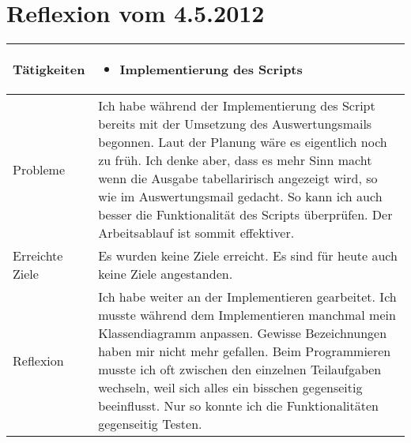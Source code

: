 
\begin{table}
\section{Reflexion vom 4.5.2012}
\begin{tabular}{| l | p{12cm} |}
    \hline
    Tätigkeiten &
    \begin{itemize}
        \item Implementierung des Scripts 
    \end{itemize}  \\
    \hline
    Probleme & 
    Ich habe während der Implementierung des Script bereits mit der Umsetzung des Auswertungsmails begonnen. Laut der Planung wäre es eigentlich noch zu früh. Ich denke aber, dass es mehr Sinn macht wenn die Ausgabe tabellaririsch angezeigt wird, so wie im Auswertungsmail gedacht. So kann ich auch besser die Funktionalität des Scripts überprüfen. Der Arbeitsablauf ist sommit effektiver.\\ 
    \hline
    Erreichte Ziele &
    Es wurden keine Ziele erreicht. Es sind für heute auch keine Ziele angestanden. \\
    \hline 
    Reflexion &
    Ich habe weiter an der Implementieren gearbeitet. Ich musste während dem Implementieren manchmal mein Klassendiagramm anpassen. Gewisse Bezeichnungen haben mir nicht mehr gefallen. Beim Programmieren musste ich oft zwischen den einzelnen Teilaufgaben wechseln, weil sich alles ein bisschen gegenseitig beeinflusst. Nur so konnte ich die Funktionalitäten gegenseitig Testen. \\ 
    \hline
\end{tabular}
\end{table}

\clearpage
